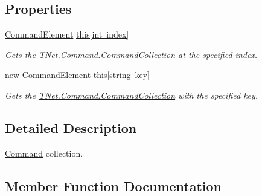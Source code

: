\subsection*{Properties}
\begin{DoxyCompactItemize}
\item 
\mbox{\hyperlink{class_t_net_1_1_command_1_1_command_element}{Command\+Element}} \mbox{\hyperlink{class_t_net_1_1_command_1_1_command_collection_aab73e8d2b4b87e345604120e19db234a}{this\mbox{[}int index\mbox{]}}}
\begin{DoxyCompactList}\small\item\em Gets the \mbox{\hyperlink{class_t_net_1_1_command_1_1_command_collection}{T\+Net.\+Command.\+Command\+Collection}} at the specified index. \end{DoxyCompactList}\item 
new \mbox{\hyperlink{class_t_net_1_1_command_1_1_command_element}{Command\+Element}} \mbox{\hyperlink{class_t_net_1_1_command_1_1_command_collection_aa47332d4f0eb06c6f8abce3c18cc0b38}{this\mbox{[}string key\mbox{]}}}
\begin{DoxyCompactList}\small\item\em Gets the \mbox{\hyperlink{class_t_net_1_1_command_1_1_command_collection}{T\+Net.\+Command.\+Command\+Collection}} with the specified key. \end{DoxyCompactList}\end{DoxyCompactItemize}


\subsection{Detailed Description}
\mbox{\hyperlink{namespace_t_net_1_1_command}{Command}} collection. 



\subsection{Member Function Documentation}
\mbox{\label{class_t_net_1_1_command_1_1_command_collection_ac298705d27479f3f87108635af6e13b9}} 
